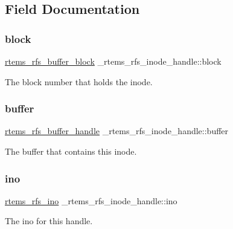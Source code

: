 \subsection{Field Documentation}
\mbox{\label{struct__rtems__rfs__inode__handle_a112006fc405e50d123d20a4ea1f02850}} 
\subsubsection{\texorpdfstring{block}{block}}
{\footnotesize\ttfamily \mbox{\hyperlink{rtems-rfs-buffer_8h_a5650d53328a5af0a78198fe780aec043}{rtems\+\_\+rfs\+\_\+buffer\+\_\+block}} \+\_\+rtems\+\_\+rfs\+\_\+inode\+\_\+handle\+::block}

The block number that holds the inode. \mbox{\label{struct__rtems__rfs__inode__handle_a811864b191be6fef3f58f3ec688dbaa0}} 
\subsubsection{\texorpdfstring{buffer}{buffer}}
{\footnotesize\ttfamily \mbox{\hyperlink{rtems-rfs-buffer_8h_a17f97c37c5273ad28d413dfd2d175e23}{rtems\+\_\+rfs\+\_\+buffer\+\_\+handle}} \+\_\+rtems\+\_\+rfs\+\_\+inode\+\_\+handle\+::buffer}

The buffer that contains this inode. \mbox{\label{struct__rtems__rfs__inode__handle_a6fe61678de151c958448620a77337174}} 
\subsubsection{\texorpdfstring{ino}{ino}}
{\footnotesize\ttfamily \mbox{\hyperlink{rtems-rfs-inode_8h_ae658325c3ff9941f2e68315d20e3c723}{rtems\+\_\+rfs\+\_\+ino}} \+\_\+rtems\+\_\+rfs\+\_\+inode\+\_\+handle\+::ino}

The ino for this handle. \mbox{\label{struct__rtems__rfs__inode__handle_a94d55c23f49ac8031c4722b2c6123edf}} 
